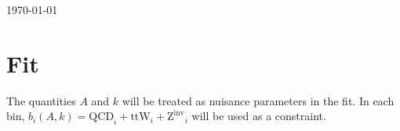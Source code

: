 \documentclass[12pt]{article}
\begin{document}
\today




\section{Fit}
The quantities $A$ and $k$ will be treated as nuisance parameters in the fit.  In each bin,
$b_i(A,k) = \mathrm{QCD}_i + \mathrm{ttW}_i + \mathrm{Z^{inv}}_i$ will be used as a constraint.
\end{document}

